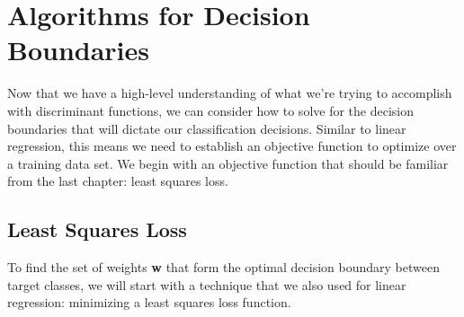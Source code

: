 \section{Algorithms for Decision Boundaries}
Now that we have a high-level understanding of what we're trying to accomplish with discriminant functions, we can consider how to solve for the decision boundaries that will dictate our classification decisions. Similar to linear regression, this means we need to establish an objective function to optimize over a training data set. We begin with an objective function that should be familiar from the last chapter: least squares loss.

\subsection{Least Squares Loss}
To find the set of weights \textbf{w} that form the optimal decision boundary between target classes, we will start with a technique that we also used for linear regression: minimizing a least squares loss function.

